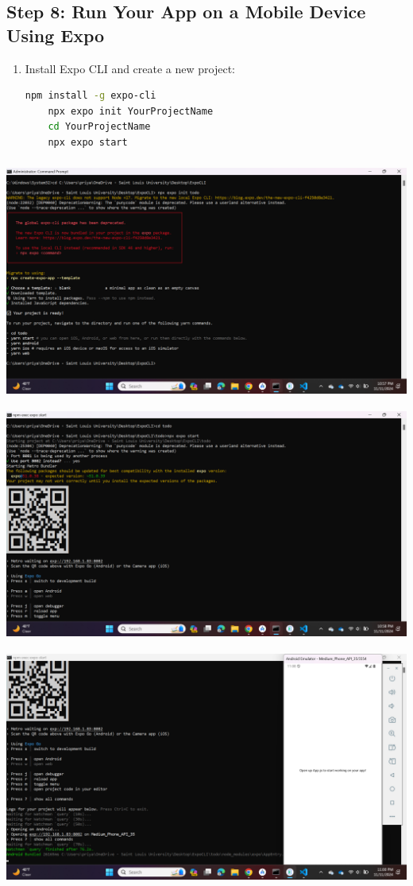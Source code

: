 \documentclass{article}
\begin{document}
\subsection*{Step 8: Run Your App on a Mobile Device Using Expo}

\begin{enumerate}
    \item Install Expo CLI and create a new project:
    \begin{lstlisting}[language=bash]
    npm install -g expo-cli
    npx expo init YourProjectName
    cd YourProjectName
    npx expo start
    \end{lstlisting}
\end{enumerate}
\includegraphics[width=5.57813in,height=3.13391in]{media/image36.png}
\includegraphics[width=5.57813in,height=3.13391in]{media/image28.png}
\includegraphics[width=5.57813in,height=3.13391in]{media/image35.png}
\end{document}
